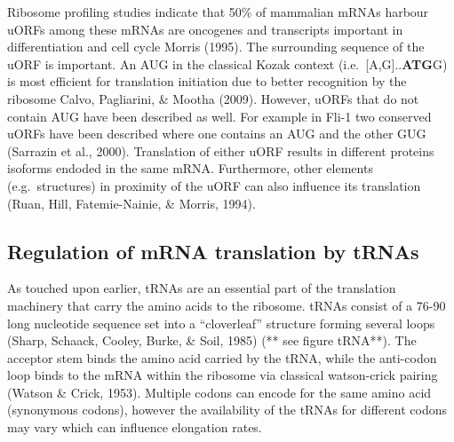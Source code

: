 \documentclass[
  12pt,
  openany]{book}
\begin{document}
Ribosome profiling studies indicate that 50\% of mammalian mRNAs harbour uORFs among these mRNAs are oncogenes and transcripts important in differentiation and cell cycle Morris (1995). The surrounding sequence of the uORF is important. An AUG in the classical Kozak context (i.e.~{[}A,G{]}..\textbf{ATG}G) is most efficient for translation initiation due to better recognition by the ribosome Calvo, Pagliarini, \& Mootha (2009). However, uORFs that do not contain AUG have been described as well. For example in Fli-1 two conserved uORFs have been described where one contains an AUG and the other GUG (Sarrazin et al., 2000). Translation of either uORF results in different proteins isoforms endoded in the same mRNA. Furthermore, other elements (e.g.~structures) in proximity of the uORF can also influence its translation (Ruan, Hill, Fatemie-Nainie, \& Morris, 1994).

\subsection{Regulation of mRNA translation by tRNAs} \label{tRNA}

As touched upon earlier, tRNAs are an essential part of the translation machinery that carry the amino acids to the ribosome. tRNAs consist of a 76-90 long nucleotide sequence set into a ``cloverleaf'' structure forming several loops (Sharp, Schaack, Cooley, Burke, \& Soil, 1985) (** see figure tRNA**). The acceptor stem binds the amino acid carried by the tRNA, while the anti-codon loop binds to the mRNA within the ribosome via classical watson-crick pairing (Watson \& Crick, 1953). Multiple codons can encode for the same amino acid (synonymous codons), however the availability of the tRNAs for different codons may vary which can influence elongation rates.
\end{document}
